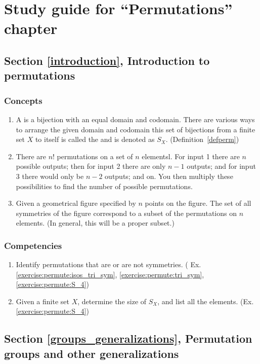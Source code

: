\section{Study guide  for ``Permutations''  chapter}\label{sec:permute:study} 


\subsection*{Section \ref{introduction}, Introduction to permutations}
\subsubsection*{Concepts}
\begin{enumerate}
\item 
A  is a bijection with an equal domain and codomain. There are various ways to arrange the given domain and codomain this set of bijections from a finite set $X$ to itself is called the  and is denoted as $S_X$. (Definition~\ref{defperm})
\item
There are $n!$  permutations on a set of $n$ elementsl. For input 1 there are $n$ possible outputs; then for input 2 there are only $n-1$ outputs; and for input 3 there would only be $n-2$ outputs; and on.  You then multiply these possibilities to find the number of possible permutations.  
\item
Given a  geometrical figure specified by $n$ points on the figure. The set of all symmetries of the figure correspond to  a subset of the permutations on $n$ elements. (In general, this will be a proper subset.)
\end{enumerate}

\subsubsection*{Competencies}
\begin{enumerate}
\item
Identify  permutations that are or are not symmetries. ( Ex.  \ref{exercise:permute:isos_tri_sym}, \ref{exercise:permute:tri_sym},  \ref{exercise:permute:S_4})
\item
Given a finite set $X$, determine the size of $S_X$, and list all the elements. (Ex. \ref{exercise:permute:S_4})
\end{enumerate}


\subsection*{Section \ref{groups_generalizations}, Permutation groups and other generalizations}
